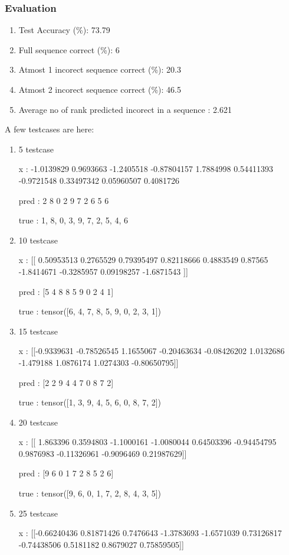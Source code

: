 \documentclass[journal,12pt,onecolumn]{IEEEtran}
\begin{document}
\subsubsection{Evaluation}
\begin{enumerate}
	\item Test Accuracy (\%): 73.79
	\item Full sequence correct (\%): 6
	\item Atmost 1 incorect sequence correct (\%): 20.3
	\item Atmost 2 incorect sequence correct (\%): 46.5
	\item Average no of rank predicted incorect in a sequence : 2.621
\end{enumerate}
A few testcases are here:
\begin{enumerate}
	\item 5 testcase

		x :  -1.0139829   0.9693663  -1.2405518  -0.87804157  1.7884998   0.54411393
  -0.9721548   0.33497342  0.05960507  0.4081726

		pred :  2 8 0 2 9 7 2 6 5 6

		true :  1, 8, 0, 3, 9, 7, 2, 5, 4, 6



	\item 10 testcase

		x :  [[ 0.50953513  0.2765529   0.79395497  0.82118666  0.4883549   0.87565
  -1.8414671  -0.3285957   0.09198257 -1.6871543 ]]

		pred :  [5 4 8 8 5 9 0 2 4 1]

		true :  tensor([6, 4, 7, 8, 5, 9, 0, 2, 3, 1])
	\item 15 testcase

		x :  [[-0.9339631  -0.78526545  1.1655067  -0.20463634 -0.08426202  1.0132686
  -1.479188    1.0876174   1.0274303  -0.80650795]]

		pred :  [2 2 9 4 4 7 0 8 7 2]

		true :  tensor([1, 3, 9, 4, 5, 6, 0, 8, 7, 2])
	\item 20 testcase

		x :  [[ 1.863396    0.3594803  -1.1000161  -1.0080044   0.64503396 -0.94454795
   0.9876983  -0.11326961 -0.9096469   0.21987629]]

		pred :  [9 6 0 1 7 2 8 5 2 6]

		true :  tensor([9, 6, 0, 1, 7, 2, 8, 4, 3, 5])
	\item 25 testcase

		x :  [[-0.66240436  0.81871426  0.7476643  -1.3783693  -1.6571039   0.73126817
  -0.74438506  0.5181182   0.8679027   0.75859505]]


\end{enumerate}
\end{document}
